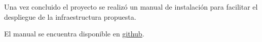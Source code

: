 \newpage
{}\label{appendix:Manual de instalacion}
Una vez concluido el proyecto se realiz\'o un manual de instalaci\'on para facilitar el despliegue de la infraestructura propuesta.

El manual se encuentra disponible en \href{https://github.com/JoseDRojasA/thesis-files/raw/master/Manual de instalación.pdf}{github}.